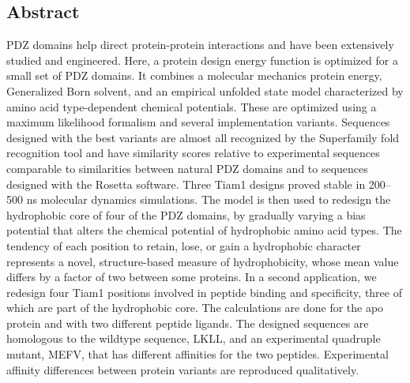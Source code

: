 \documentclass[12pt]{article}
\begin{document}
\subsection*{Abstract}
PDZ domains help direct protein-protein interactions and have been extensively studied and engineered. Here, a protein design
energy function is optimized for a small set of PDZ domains. It combines a molecular mechanics protein energy, Generalized
Born solvent, and an empirical unfolded state model characterized by amino acid type-dependent chemical potentials. These are
optimized using a maximum likelihood formalism and several implementation variants. Sequences designed with the best variants
are almost all recognized by the Superfamily fold recognition tool and have similarity scores relative to experimental sequences
comparable to similarities between natural PDZ domains and to sequences designed with the Rosetta software. Three Tiam1 designs
proved stable in 200--500 ns molecular dynamics simulations. The model is then used to redesign the hydrophobic core of four
of the PDZ domains, by gradually varying a bias potential that alters the chemical potential of hydrophobic amino acid types.
The tendency of each position to retain, lose, or gain a hydrophobic character represents a novel, structure-based measure of
hydrophobicity, whose mean value differs by a factor of two between some proteins. In a second application, we redesign four
Tiam1 positions involved in peptide binding and specificity, three of which are part of the hydrophobic core. The calculations
are done for the apo protein and with two different peptide ligands. The designed sequences are homologous to the wildtype
sequence, LKLL, and an experimental quadruple mutant, MEFV, that has different affinities for the two peptides. Experimental
affinity differences between protein variants are reproduced qualitatively.

\pagebreak
\end{document}

